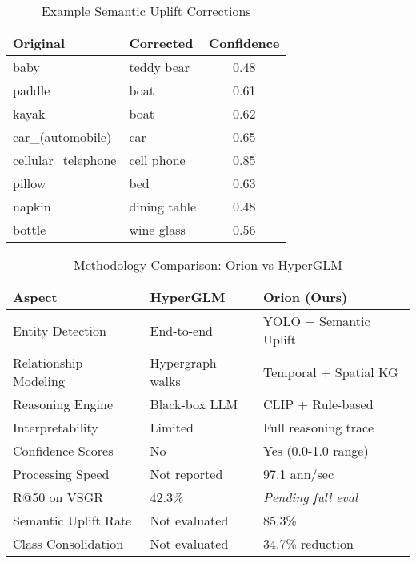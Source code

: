 \begin{table}[t]
\centering
\caption{Example Semantic Uplift Corrections}
\label{tab:corrections}
\small
\begin{tabular}{llc}
\toprule
\textbf{Original} & \textbf{Corrected} & \textbf{Confidence} \\
\midrule
baby & teddy bear & 0.48 \\
paddle & boat & 0.61 \\
kayak & boat & 0.62 \\
car\_(automobile) & car & 0.65 \\
cellular\_telephone & cell phone & 0.85 \\
pillow & bed & 0.63 \\
napkin & dining table & 0.48 \\
bottle & wine glass & 0.56 \\
\bottomrule
\end{tabular}
\end{table}


\begin{table*}[t]
\centering
\caption{Methodology Comparison: Orion vs HyperGLM}
\label{tab:methodology}
\begin{tabular}{lll}
\toprule
\textbf{Aspect} & \textbf{HyperGLM} & \textbf{Orion (Ours)} \\
\midrule
Entity Detection & End-to-end & YOLO + Semantic Uplift \\
Relationship Modeling & Hypergraph walks & Temporal + Spatial KG \\
Reasoning Engine & Black-box LLM & CLIP + Rule-based \\
Interpretability & Limited & Full reasoning trace \\
Confidence Scores & No & Yes (0.0-1.0 range) \\
Processing Speed & Not reported & 97.1 ann/sec \\
\midrule
R@50 on VSGR & 42.3\% & \textit{Pending full eval} \\
Semantic Uplift Rate & Not evaluated & 85.3\% \\
Class Consolidation & Not evaluated & 34.7\% reduction \\
\bottomrule
\end{tabular}
\end{table*}


